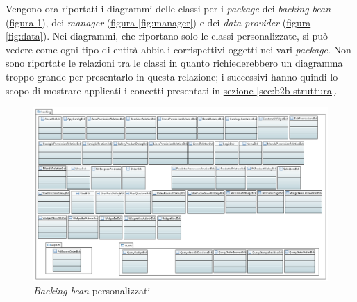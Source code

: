 Vengono ora riportati i diagrammi delle classi per i \textit{package} dei \textit{backing bean} (\hyperref[fig:bck]{figura \ref{fig:bck}}), dei \textit{manager} (\hyperref[fig:manager]{figura \ref{fig:manager}}) e dei \textit{data provider} (\hyperref[fig:data]{figura \ref{fig:data}}). Nei diagrammi, che riportano solo le classi personalizzate, si può vedere come ogni tipo di entità abbia i corrispettivi oggetti nei vari \textit{package}. Non sono riportate le relazioni tra le classi in quanto richiederebbero un diagramma troppo grande per presentarlo in questa relazione; i successivi hanno quindi lo scopo di mostrare applicati i concetti presentati in \hyperref[sec:b2b-struttura]{sezione \ref{sec:b2b-struttura}}.
\begin{figure}[H]
	\centering
	\includegraphics[height=\linewidth,angle=90]{Immagini/p2/bck.png}
	\caption{\textit{Backing bean} personalizzati}
	\label{fig:bck}
\end{figure}
